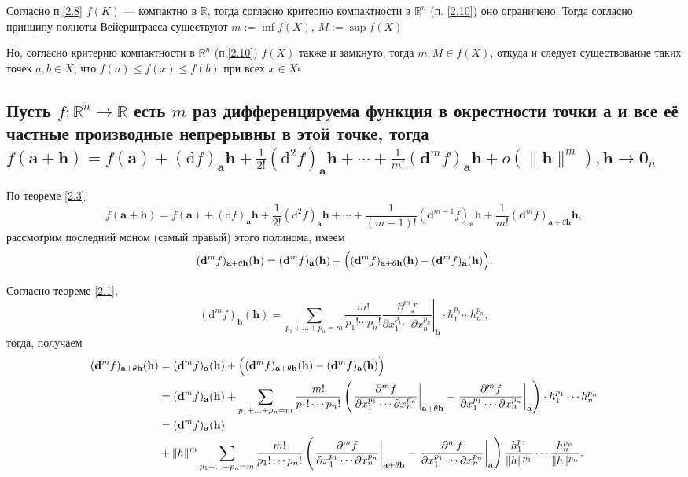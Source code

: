 \documentclass[a4paper]{article}
\newcommand{\qed}{\hfill$\square$}
\newcommand{\m}[1]{\mathbf{#1}}
\begin{document}
Согласно п.\ref{2.8} $f(K)$ — компактно в $\mathbb{R}$, тогда согласно критерию компактности в $\mathbb{R}^n$ (п. \ref{2.10}) оно ограничено. Тогда согласно принципу полноты Вейерштрасса существуют $m:=\inf f(X)$, $M:= \sup f(X)$

Но, согласно критерию компактности в $\mathbb{R}^n$ (п.\ref{2.10}) $f(X)$ также и замкнуто, тогда $m,M \in f(X)$, откуда и следует существование таких точек $a,b\in X$, что $f(a) \le f(x) \le f(b)$ при всех $x\in X$\qed


\subsection{Пусть $f: \mathbb{R}^{n} \rightarrow \mathbb{R}$ есть $m$ раз дифференцируема функция в окрестности точки а и все её частные производные непрерывны в этой точке, тогда $f(\mathbf{a}+\mathbf{h})=f(\mathbf{a})+(\mathrm{d} f)_{\mathbf{a}} \mathbf{h}+\frac{1}{2 !}\left(\mathrm{d}^{2} f\right)_{\mathbf{a}} \mathbf{h}+\cdots+\frac{1}{m !}\left(\mathbf{d}^{m} f\right)_{\mathbf{a}} \mathbf{h}+o\left(\|\mathbf{h}\|^{m}\right),\mathbf{h} \rightarrow \mathbf{0}_{n}$}
По теореме \ref{2.3}, 
$$
f(\m{a} + \m{h}) = f(\m{a}) + (\mathrm{d}f)_\m{a} \m{h} + \frac{1}{2!} (\mathrm{d}^2f)_\m{a}\m{h} + \cdots + \frac{1}{(m-1)!} (\m{d}^{m-1}f)_\m{a}\m{h} + \frac{1}{m!} (\m{d}^{m}f)_{\m{a}+ \theta \m{h}}\m{h},
$$
рассмотрим последний моном (самый правый) этого полинома, имеем
$$
(\m{d}^{m}f)_{\m{a}+ \theta \m{h}}(\m{h})= (\m{d}^{m}f)_{\m{a}}(\m{h}) +  \Bigl( (\m{d}^{m}f)_{\m{a}+ \theta \m{h}}(\m{h}) - (\m{d}^{m}f)_{\m{a}} (\m{h}) \Bigr).
$$

Согласно теореме \ref{2.1}, 
$$
(\mathrm{d}^mf)_{\m{b}}(\m{h}) = \sum_{p_1 + \ldots + p_n = m} \dfrac{m!}{p_1! \cdots p_n!} \left.\frac{\partial^m f}{\partial x_1^{p_1} \cdots \partial x_n^{p_n}}\right|_{\m{b}} \cdot h_1^{p_1}\cdots h_n^{p_n},
$$
тогда, получаем
$$\begin{aligned}
(\m{d}^{m}f)_{\m{a}+ \theta \m{h}}(\m{h}) &= (\m{d}^{m}f)_{\m{a}}(\m{h}) +  \Bigl( (\m{d}^{m}f)_{\m{a}+ \theta \m{h}}(\m{h}) - (\m{d}^{m}f)_{\m{a}} (\m{h}) \Bigr) \\
&= (\m{d}^{m}f)_{\m{a}}(\m{h}) + \sum_{p_1 + \ldots + p_n = m} \dfrac{m!}{p_1! \cdots p_n!}\left( \left.\frac{\partial^m f}{\partial x_1^{p_1} \cdots \partial x_n^{p_n}}\right|_{\m{a}+\theta \m{h}} - \left.\frac{\partial^m f}{\partial x_1^{p_1} \cdots \partial x_n^{p_n}}\right|_{\m{a}} \right)\cdot h_1^{p_1}\cdots h_n^{p_n} \\
&= (\m{d}^{m}f)_{\m{a}}(\m{h})\\
&+ \|h \|^m \sum_{p_1 + \ldots + p_n = m} \dfrac{m!}{p_1! \cdots p_n!}\left( \left.\frac{\partial^m f}{\partial x_1^{p_1} \cdots \partial x_n^{p_n}}\right|_{\m{a}+\theta \m{h}} - \left.\frac{\partial^m f}{\partial x_1^{p_1} \cdots \partial x_n^{p_n}}\right|_{\m{a}} \right) \frac{h_1^{p_1}}{\|h\|^{p_1}} \cdots \frac{h_n^{p_n}}{\|h\|^{p_n}}.
\end{aligned}$$
\end{document}
